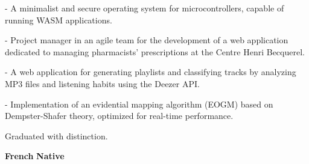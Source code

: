 \documentclass[10pt,a4paper,ragged2e,withhyper]{../AltaCV/altacv}
\begin{document}
\begin{paracol}{2}
  \smallskip


  \begin{minipage}[t]{0.49\linewidth}
    {\small {} - A minimalist and secure operating system for microcontrollers, capable of running WASM applications.}

    \divider

    {\small {} - Project manager in an agile team for the development of a web application dedicated to managing pharmacists' prescriptions at the Centre Henri Becquerel.}
  \end{minipage}
  \hfill
  \begin{minipage}[t]{0.49\linewidth}
    {\small {} - A web application for generating playlists and classifying tracks by analyzing MP3 files and listening habits using the Deezer API.}

    \divider

    {\small {} -  Implementation of an evidential mapping algorithm (EOGM) based on Dempster-Shafer theory, optimized for real-time performance.}
  \end{minipage}

  \medskip

  \switchcolumn



  \divider

  Graduated with distinction.

  \divider



  \textcolor{emphasis}{\textbf{French}} \hfill \textbf{Native}\\


\end{paracol}
\end{document}

